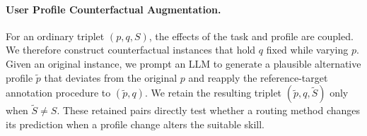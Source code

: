 \documentclass[letterpaper]{article} %
\begin{document}
\paragraph{User Profile Counterfactual Augmentation.}

For an ordinary triplet $(p,q,S)$, the effects of the task and profile are coupled. We therefore construct counterfactual instances that hold $q$ fixed while varying $p$. Given an original instance, we prompt an LLM to generate a plausible alternative profile $\tilde{p}$ that deviates from the original $p$ and reapply the reference-target annotation procedure to $(\tilde{p},q)$. We retain the resulting triplet $(\tilde{p},q,\tilde{S})$ only when $\tilde{S}\neq S$. These retained pairs directly test whether a routing method changes its prediction when a profile change alters the suitable skill.

\end{document}
